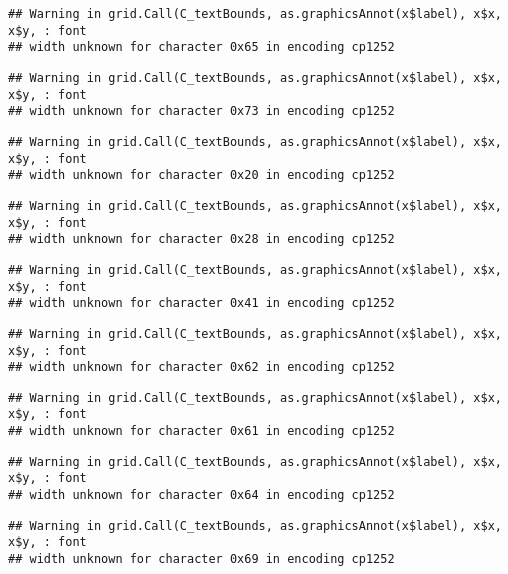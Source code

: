 \documentclass[
]{article}
\begin{document}
\begin{verbatim}
## Warning in grid.Call(C_textBounds, as.graphicsAnnot(x$label), x$x, x$y, : font
## width unknown for character 0x65 in encoding cp1252
\end{verbatim}

\begin{verbatim}
## Warning in grid.Call(C_textBounds, as.graphicsAnnot(x$label), x$x, x$y, : font
## width unknown for character 0x73 in encoding cp1252
\end{verbatim}

\begin{verbatim}
## Warning in grid.Call(C_textBounds, as.graphicsAnnot(x$label), x$x, x$y, : font
## width unknown for character 0x20 in encoding cp1252
\end{verbatim}

\begin{verbatim}
## Warning in grid.Call(C_textBounds, as.graphicsAnnot(x$label), x$x, x$y, : font
## width unknown for character 0x28 in encoding cp1252
\end{verbatim}

\begin{verbatim}
## Warning in grid.Call(C_textBounds, as.graphicsAnnot(x$label), x$x, x$y, : font
## width unknown for character 0x41 in encoding cp1252
\end{verbatim}

\begin{verbatim}
## Warning in grid.Call(C_textBounds, as.graphicsAnnot(x$label), x$x, x$y, : font
## width unknown for character 0x62 in encoding cp1252
\end{verbatim}

\begin{verbatim}
## Warning in grid.Call(C_textBounds, as.graphicsAnnot(x$label), x$x, x$y, : font
## width unknown for character 0x61 in encoding cp1252
\end{verbatim}

\begin{verbatim}
## Warning in grid.Call(C_textBounds, as.graphicsAnnot(x$label), x$x, x$y, : font
## width unknown for character 0x64 in encoding cp1252
\end{verbatim}

\begin{verbatim}
## Warning in grid.Call(C_textBounds, as.graphicsAnnot(x$label), x$x, x$y, : font
## width unknown for character 0x69 in encoding cp1252
\end{verbatim}
\end{document}
